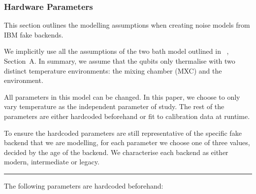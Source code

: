 \documentclass[showpacs,amsmath,amssymb,twocolumn,superscriptaddress,notitlepage,preprintnumbers,pra]{revtex4-1}
\begin{document}
\subsubsection{Hardware Parameters}

This section outlines the modelling assumptions when creating noise models from IBM fake backends.

We implicitly use all the assumptions of the two bath model outlined in ~\cite{lvov2025thermometry}, Section~A. In summary, we assume that the qubits only thermalise with two distinct temperature environments: the mixing chamber (MXC) and the environment.

All parameters in this model can be changed. In this paper, we choose to only vary temperature as the independent parameter of study. The rest of the parameters are either hardcoded beforehand or fit to calibration data at runtime.

To ensure the hardcoded parameters are still representative of the specific fake backend that we are modelling, for each parameter we choose one of three values, decided by the age of the backend. We characterise each backend as either modern, intermediate or legacy.

\noindent\rule{0.5\textwidth}{0.4pt}

The following parameters are hardcoded beforehand:
\end{document}
